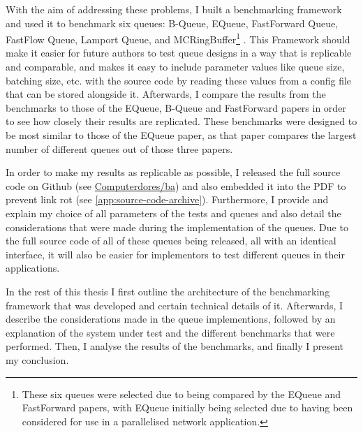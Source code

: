With the aim of addressing these problems, I built a benchmarking framework and used it to benchmark six
queues: B-Queue, EQueue, FastForward Queue, FastFlow Queue, Lamport Queue, and MCRingBuffer\footnote{These six
    queues were selected due to being compared by the EQueue and FastForward papers, with EQueue initially being
selected due to having been considered for use in a parallelised network application.}
\cite{B-Queue,EQueue,FastForward,FastFlowGithub,Lamport,MCRingBuffer}.
This Framework should make it easier for future authors to test queue designs in a way that is replicable and
comparable, and makes it easy to include parameter values like queue size, batching size, etc. with the
source code by reading these values from a config file that can be stored alongside it.
Afterwards, I compare the results from the benchmarks to those of the EQueue, B-Queue and FastForward papers
in order to see how closely their results are replicated.
These benchmarks were designed to be most similar to those of the EQueue paper, as that paper compares the
largest number of different queues out of those three papers.

In order to make my results as replicable as possible, I released the full source code on Github (see
\href{https://github.com/Computerdores/ba}{Computerdores/ba}) and also embedded it into the PDF to prevent
link rot (see \autoref{app:source-code-archive}).
Furthermore, I provide and explain my choice of all parameters of the tests and queues and also detail the
considerations that were made during the implementation of the queues.
Due to the full source code of all of these queues being released, all with an identical interface, it will
also be easier for implementors to test different queues in their applications.

In the rest of this thesis I first outline the architecture of the benchmarking framework that was developed
and certain technical details of it.
Afterwards, I describe the considerations made in the queue implementions, followed by an explanation of the
system under test and the different benchmarks that were performed.
Then, I analyse the results of the benchmarks, and finally I present my conclusion.
